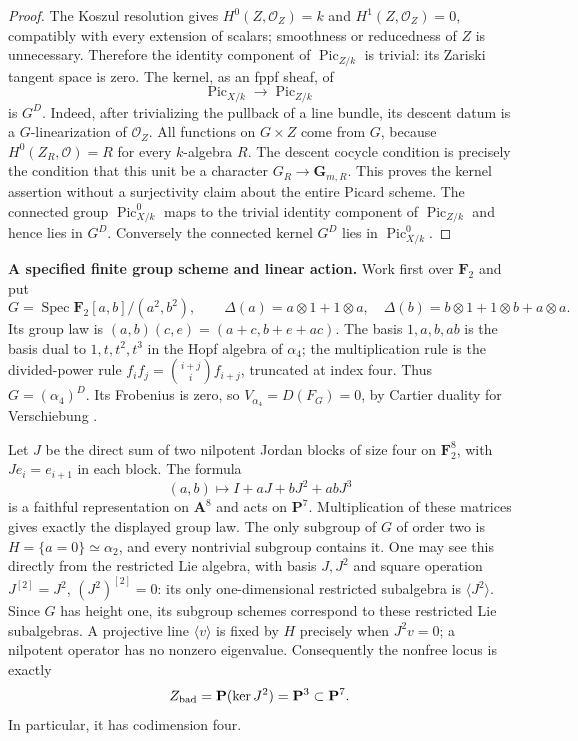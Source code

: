 \begin{proof}
The Koszul resolution gives $H^0(Z,\mathcal O_Z)=k$ and
$H^1(Z,\mathcal O_Z)=0$, compatibly with every extension of scalars;
smoothness or reducedness of $Z$ is unnecessary.  Therefore the
identity component of $\operatorname{Pic}_{Z/k}$ is trivial: its
Zariski tangent space is zero.  The kernel, as an fppf sheaf, of
\[
 \operatorname{Pic}_{X/k}\longrightarrow\operatorname{Pic}_{Z/k}
\]
is $G^D$.  Indeed, after trivializing the pullback of a line bundle,
its descent datum is a $G$-linearization of $\mathcal O_Z$.
All functions on $G\times Z$ come from $G$, because
$H^0(Z_R,\mathcal O)=R$ for every $k$-algebra $R$.  The descent
cocycle condition is precisely the condition that this unit be a
character $G_R\to\mathbf G_{m,R}$.  This proves the kernel assertion
without a surjectivity claim about the entire Picard scheme.
The connected group $\operatorname{Pic}_{X/k}^0$ maps to the trivial
identity component of $\operatorname{Pic}_{Z/k}$ and hence lies in
$G^D$.  Conversely the connected kernel $G^D$ lies in
$\operatorname{Pic}_{X/k}^0$.
\end{proof}

\par\smallskip\noindent\textbf{A specified finite group scheme and linear action.}
Work first over $\mathbf F_2$ and put
\[
 G=\operatorname{Spec}\mathbf F_2[a,b]/(a^2,b^2),\qquad
 \Delta(a)=a\otimes1+1\otimes a,\quad
 \Delta(b)=b\otimes1+1\otimes b+a\otimes a.
\]
Its group law is
$(a,b)(c,e)=(a+c,b+e+ac)$.  The basis $1,a,b,ab$ is the basis dual
to $1,t,t^2,t^3$ in the Hopf algebra of $\alpha_4$; the multiplication
rule is the divided-power rule
$f_if_j=\binom{i+j}{i}f_{i+j}$, truncated at index four.  Thus
$G=(\alpha_4)^D$.  Its Frobenius is zero, so
$V_{\alpha_4}=D(F_G)=0$, by Cartier duality for Verschiebung
\cite[Proposition~5.19]{EdixhovenVanDerGeerMoonenAV}.

Let $J$ be the direct sum of two nilpotent Jordan blocks of size
four on $\mathbf F_2^8$, with $J e_i=e_{i+1}$ in each block.
The formula
\begin{equation}\label{eq:alpha4-regular-action}
 (a,b)\longmapsto I+aJ+bJ^2+abJ^3
\end{equation}
is a faithful representation on $\mathbf A^8$ and acts on
$\mathbf P^7$.  Multiplication of these matrices gives exactly the
displayed group law.
The only subgroup of $G$ of order two is
$H=\{a=0\}\simeq\alpha_2$, and every nontrivial subgroup contains it.
One may see this directly from the restricted Lie algebra, with
basis $J,J^2$ and square operation $J^{[2]}=J^2$, $(J^2)^{[2]}=0$:
its only one-dimensional restricted subalgebra is $\langle J^2\rangle$.
Since $G$ has height one, its subgroup schemes correspond to these
restricted Lie subalgebras.  A projective line $\langle v\rangle$
is fixed by $H$ precisely when $J^2v=0$; a nilpotent operator has
no nonzero eigenvalue.  Consequently the nonfree locus is exactly
\[
 Z_{\rm bad}=\mathbf P(\ker J^2)=\mathbf P^3\subset\mathbf P^7.
\]
In particular, it has codimension four.

